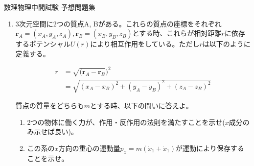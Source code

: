 \documentclass{jsarticle}
\begin{document}
\begin{center}
    {\huge 数理物理中間試験 予想問題集}\\
\end{center}

\begin{enumerate}
    \item 3次元空間に2つの質点A, Bがある。これらの質点の座標をそれぞれ$\bm{r}_A = (x_A,y_A,z_A), \bm{r}_B = (x_B,y_B,z_B)$とする時、これらが相対距離$r$に依存するポテンシャル$U(r)$により相互作用をしている。ただし$r$は以下のように定義する。

          $$
              \begin{aligned}
                  r & = \sqrt{(\boldsymbol{r}_A -\boldsymbol{r}_B})^2 \\
                    & = \sqrt{(x_A-x_B)^2+(y_A-y_B)^2+(z_A-z_B)^2}
              \end{aligned}
          $$

          質点の質量をどちらも$m$とする時、以下の問いに答えよ。

          \begin{enumerate}
              \item 2つの物体に働く力が、作用・反作用の法則を満たすことを示せ($x$成分のみ示せば良い)。
              \item この系の$x$方向の重心の運動量$p_x = m(\dot{x}_1 + \dot{x}_1)$が運動により保存することを示せ。

          \end{enumerate}


\end{enumerate}
\end{document}
